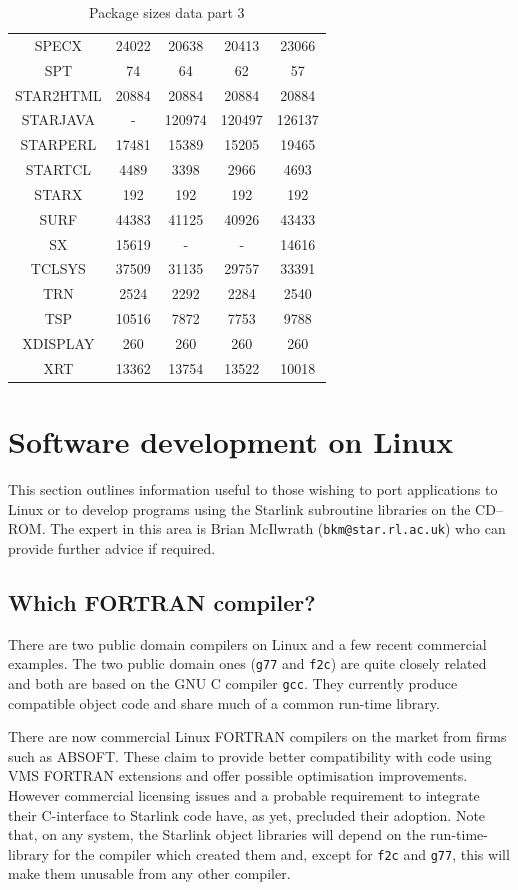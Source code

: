 \documentclass[twoside,11pt]{article}
\newcommand{\xlabel}[1]{}
\renewcommand{\_}{\texttt{\symbol{95}}}
\newcommand{\cdrom}{CD--ROM}
\newcommand{\cdrom}{CD-ROM}
\begin{document}
\begin{table}[p]
\begin{center}
\begin{tabular}{|c|c|c|c|c|}
SPECX & 24022 & 20638 & 20413 & 23066 \\
SPT & 74 & 64 & 62 & 57 \\
STAR2HTML & 20884 & 20884 & 20884 & 20884 \\
STARJAVA & - & 120974 & 120497 & 126137 \\
STARPERL & 17481 & 15389 & 15205 & 19465 \\
STARTCL & 4489 & 3398 & 2966 & 4693 \\
STARX & 192 & 192 & 192 & 192 \\
SURF & 44383 & 41125 & 40926 & 43433 \\
SX & 15619 & - & - & 14616 \\
TCLSYS & 37509 & 31135 & 29757 & 33391 \\
TRN & 2524 & 2292 & 2284 & 2540 \\
TSP & 10516 & 7872 & 7753 & 9788 \\
XDISPLAY & 260 & 260 & 260 & 260 \\
XRT & 13362 & 13754 & 13522 & 10018 \\
\hline
\end{tabular}
\caption{Package sizes data part 3}
\end{center}
\end{table}

\newpage
\section{\xlabel{software_development_on_linux}Software development on Linux}
\label{software_development_on_linux}

This section outlines information useful to those wishing to port
applications to Linux or to develop programs using the Starlink subroutine
libraries on the \cdrom\@.  The expert in this area is Brian McIlwrath
(\texttt{bkm@star.rl.ac.uk}) who can provide further advice if required.

\subsection{Which FORTRAN compiler?}

There are two public domain compilers on Linux and a few recent commercial
examples.  The two public domain ones (\texttt{g77} and \texttt{f2c}) are
quite closely related and both are based on the GNU C compiler \texttt{gcc}.
They currently produce compatible object code and share much of a common
run-time library.

There are now commercial Linux FORTRAN compilers on the market from firms
such as ABSOFT\@.  These claim to provide better compatibility with code
using VMS FORTRAN extensions and offer possible optimisation improvements.
However commercial licensing issues and a probable requirement to
integrate their C-interface to Starlink code have, as yet, precluded
their adoption.  Note that, on any system, the Starlink object
libraries will depend on the run-time-library for the compiler which
created them and, except for \texttt{f2c} and \texttt{g77}, this will
make them unusable from any other compiler.
\end{document}
